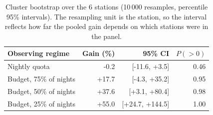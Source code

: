 \begin{table}[t]
\caption{Cluster bootstrap over the 6 stations (10\,000 resamples, percentile 95\% intervals). The resampling unit is the station, so the interval reflects how far the pooled gain depends on which stations were in the panel.}
\label{tab:bootstrap}
\centering
\small
\begin{tabular}{lrrr}
\toprule
Observing regime & Gain (\%) & 95\% CI & $P(>0)$ \\
\midrule
Nightly quota & -0.2 & [-11.6, +3.5] & 0.46 \\
Budget, 75\% of nights & +17.7 & [-4.3, +35.2] & 0.95 \\
Budget, 50\% of nights & +37.6 & [+3.1, +80.4] & 0.98 \\
Budget, 25\% of nights & +55.0 & [+24.7, +144.5] & 1.00 \\
\bottomrule
\end{tabular}
\end{table}
